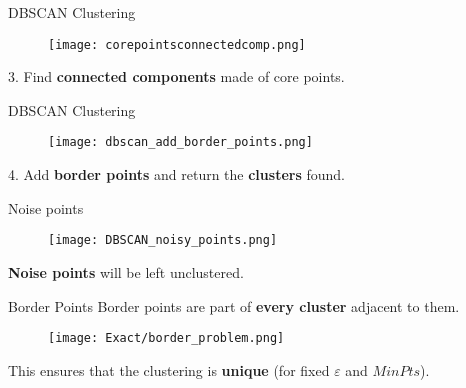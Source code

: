 \documentclass[aspectratio=169]{beamer}
\renewcommand{\epsilon}{\varepsilon}
\begin{document}
\begin{frame}{DBSCAN Clustering}
    \begin{minipage}[c]{0.55\textwidth}
        \begin{figure}
            \centering
            \texttt{[image: corepointsconnectedcomp.png]}
        \end{figure}
    \end{minipage}
    \hfill
    \begin{minipage}[c]{0.44\textwidth}
        3. Find \textbf{connected components} made of core points.
    \end{minipage}
\end{frame}

\begin{frame}{DBSCAN Clustering}
    \begin{minipage}[c]{0.55\textwidth}
        \begin{figure}
            \centering
            \texttt{[image: dbscan\_add\_border\_points.png]}
        \end{figure}
    \end{minipage}
    \hfill
    \begin{minipage}[c]{0.44\textwidth}
        4. Add \textbf{border points} and return the \textbf{clusters} found.
    \end{minipage}
\end{frame}

\begin{frame}{Noise points}

    \begin{minipage}[c]{0.55\textwidth}
        \begin{figure}
        \centering
        \texttt{[image: DBSCAN\_noisy\_points.png]}
    \end{figure}
    \end{minipage}
    \hfill
    \begin{minipage}[c]{0.44\textwidth}
        \textbf{Noise points} will be left unclustered.
    \end{minipage}    
    
\end{frame}

\begin{comment}

\end{comment}

\begin{frame}{Border Points}
   \centering Border points are part of \textbf{every cluster} adjacent to them.
    \begin{figure}
        \centering
        \texttt{[image: Exact/border\_problem.png]}
    \end{figure}

   \centering This ensures that the clustering is \textbf{unique} (for fixed $\epsilon$ and  $MinPts$).
\end{frame}
\end{document}
